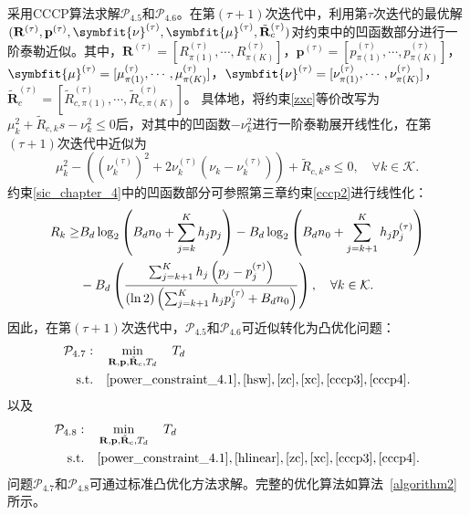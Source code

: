  采用CCCP算法求解$\mathcal{P}_{4.5}$和$\mathcal{P}_{4.6}$。在第$(\tau+1)$次迭代中，利用第$\tau$次迭代的最优解$(\mathbf{R}^{(\tau)},\mathbf{p}^{(\tau)},\symbfit{\nu}^{(\tau)},\symbfit{\mu}^{(\tau)},\tilde{\mathbf{R}}_c^{(\tau)})$对约束中的凹函数部分进行一阶泰勒近似。其中，$\mathbf{R}^{(\tau)}=[R_{\pi(1)}^{(\tau)},\cdots,R_{\pi(K)}^{(\tau)}]$，$\mathbf{p}^{(\tau)}=[p_{\pi(1)}^{(\tau)},\cdots,p_{\pi(K)}^{(\tau)}]$，$\symbfit{\mu}^{(\tau)}=[\mu_{\pi(1)}^{(\tau)},\cdots,\mu_{\pi(K)}^{(\tau)}]$，$\symbfit{\nu}^{(\tau)}=[\nu_{\pi(1)}^{(\tau)},\cdots,\nu_{\pi(K)}^{(\tau)}]$，$\tilde{\mathbf{R}}_c^{(\tau)}=[\tilde{R}_{c,\pi(1)}^{(\tau)},\cdots,\tilde{R}_{c,\pi(K)}^{(\tau)}]$。
 具体地，将约束\eqref{zxc}等价改写为$\mu_k^2+\tilde{R}_{c,k}s-\nu_k^2\leq 0$后，对其中的凹函数$-\nu_k^2$进行一阶泰勒展开线性化，在第$(\tau+1)$次迭代中近似为
\begin{equation}
	\mu_k^2-\left(\left(\nu_k^{(\tau)}\right)^2+2\nu_k^{(\tau)}\left(\nu_k-\nu_k^{(\tau)}\right)\right)+ \tilde{R}_{c,k}s\leq 0, \quad \forall k\in\mathcal{K}.\label{cccp3}
	\end{equation}
 约束\eqref{sic_chapter_4}中的凹函数部分可参照第三章约束\eqref{cccp2}进行线性化：
\begin{align}
	R_k \geq & B_d\log_2\left(B_dn_0+\sum_{j=k}^{K}h_jp_j\right)-B_d\log_2\left(B_dn_0+\sum_{j=k+1}^{K}h_jp_j^{(\tau)}\right) \notag\\
	&-B_d\left(\frac{\sum_{j=k+1}^{K}h_j\left(p_j-p_j^{(\tau)}\right)}{(\ln2)\left(\sum_{j=k+1}^{K}h_jp_j^{(\tau)}+B_dn_0\right)}\right), \quad \forall k\in\mathcal{K}.\label{cccp4}
\end{align}
因此，在第$(\tau+1)$次迭代中，$\mathcal{P}_{4.5}$和$\mathcal{P}_{4.6}$可近似转化为凸优化问题：
\begin{align}
	\mathcal{P}_{4.7}: \quad & \min_{\mathbf{R},\mathbf{p},\tilde{\mathbf{R}}_c,T_d} \quad T_{d}\\
	\text{s.t.} \quad & \eqref{power_constraint_4.1}, \eqref{hsw}, \eqref{zc}, \eqref{xc}, \eqref{cccp3}, \eqref{cccp4}.\notag
\end{align}
以及
\begin{align}
	\mathcal{P}_{4.8}: \quad & \min_{\mathbf{R},\mathbf{p},\tilde{\mathbf{R}}_c,T_d} \quad T_{d}\\
	\text{s.t.} \quad & \eqref{power_constraint_4.1}, \eqref{hlinear}, \eqref{zc}, \eqref{xc}, \eqref{cccp3}, \eqref{cccp4}.\notag
\end{align}
问题$\mathcal{P}_{4.7}$和$\mathcal{P}_{4.8}$可通过标准凸优化方法求解。完整的优化算法如算法~\ref{algorithm2}所示。



